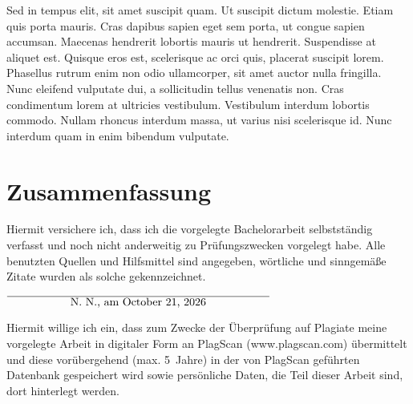 \documentclass[12pt,twoside,a4paper,parskip]{scrbook}
\def\BaAuthor{Achim Winter}
\def\ShowBaAuthor{\BaAuthor}
\def\ShowBaAuthor{N.~N.}
\begin{document}
Sed in tempus elit, sit amet suscipit quam. Ut suscipit dictum molestie. Etiam quis porta mauris. Cras dapibus sapien eget sem porta, ut congue sapien accumsan. Maecenas hendrerit lobortis mauris ut hendrerit. Suspendisse at aliquet est. Quisque eros est, scelerisque ac orci quis, placerat suscipit lorem. Phasellus rutrum enim non odio ullamcorper, sit amet auctor nulla fringilla. Nunc eleifend vulputate dui, a sollicitudin tellus venenatis non. Cras condimentum lorem at ultricies vestibulum. Vestibulum interdum lobortis commodo. Nullam rhoncus interdum massa, ut varius nisi scelerisque id. Nunc interdum quam in enim bibendum vulputate.

\chapter{Zusammenfassung}


\backmatter

\listoffigures
{}

\listoftables


\cleardoublepage
{}
{}
\printbibliography



Hiermit versichere ich, dass ich die vorgelegte Bachelorarbeit selbstständig verfasst und noch nicht anderweitig zu Prüfungszwecken vorgelegt habe. Alle benutzten Quellen und Hilfsmittel sind angegeben, wörtliche und sinngemäße Zitate wurden als solche gekennzeichnet.

\vspace{20pt}
\begin{flushright}
$\overline{~~~~~~~~~~~~~~~~~\mbox{\ShowBaAuthor, am \today}~~~~~~~~~~~~~~~~~}$
\end{flushright}


Hiermit willige ich ein, dass zum Zwecke der Überprüfung auf Plagiate meine vorgelegte Arbeit in digitaler Form an PlagScan (www.plagscan.com) übermittelt und diese vorübergehend (max. 5~Jahre) in der von PlagScan geführten Datenbank gespeichert wird sowie persönliche Daten, die Teil dieser Arbeit sind, dort hinterlegt werden.
\end{document}
